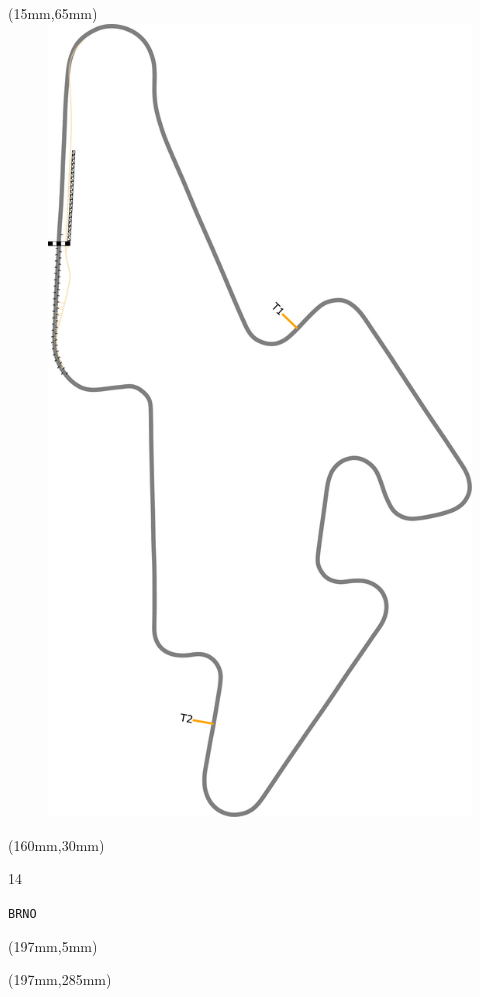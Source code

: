 \begin{textblock*}{185mm}(15mm,65mm)%
\centering
\mbox{\includegraphics[width=185mm,height=210mm,keepaspectratio]{PT/BRNO.pdf}}
\end{textblock*}
\begin{textblock*}{40mm}(160mm,30mm)%
\Large
\par{} 
\par14 
\par\hfill\tiny\tt BRNO\\
\end{textblock*}
\begin{textblock*}{20mm}(197mm,5mm)%
\fbox{\thepage}
\label{BRNO}
\end{textblock*}
\begin{textblock*}{20mm}(197mm,285mm)%
\fbox{\thepage}
\end{textblock*}

